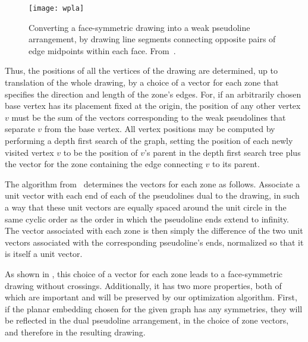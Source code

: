 \documentclass[11pt,letter]{article}
\begin{document}
\begin{figure}[t]
\centering\texttt{[image: wpla]}
\caption{Converting a face-symmetric drawing into a weak pseudoline
arrangement, by drawing line segments connecting opposite pairs of
edge midpoints within each face. From~\cite{Epp-GD-04}.}
\label{fig:wpla}
\end{figure}

Thus, the positions of all the vertices of the drawing are determined,
up to translation of the whole drawing, by a choice of a vector for each zone that specifies the direction and length of the zone's edges. For, if an arbitrarily chosen base vertex has its
placement fixed at the origin, the position of any other vertex $v$
must be the sum of the vectors corresponding to the weak pseudolines
that separate $v$ from the base vertex. All vertex positions may be
computed by performing a depth first search of the graph, setting the
position of each newly visited vertex $v$ to be the position of $v$'s
parent in the depth first search tree plus the vector for the zone
containing the edge connecting $v$ to its parent.

The algorithm from~\cite{Epp-GD-04} determines the vectors for each
zone as follows. Associate a unit vector with each end of each of the
pseudolines dual to the drawing, in such a way that these unit vectors
are equally spaced around the unit circle in the same cyclic order as
the order in which the pseudoline ends extend to infinity. The vector
associated with each zone is then simply the difference of the two
unit vectors associated with the corresponding pseudoline's ends,
normalized so that it is itself a unit vector.

As shown in \cite{Epp-GD-04}, this choice of a vector for each zone
leads to a face-symmetric drawing without crossings. Additionally, it
has two more properties, both of which are important and will be preserved by our optimization algorithm. First, if the planar embedding
chosen for the given graph has any symmetries, they will be reflected
in the dual pseudoline arrangement, in the choice of zone vectors, and
therefore in the resulting drawing.
\end{document}
